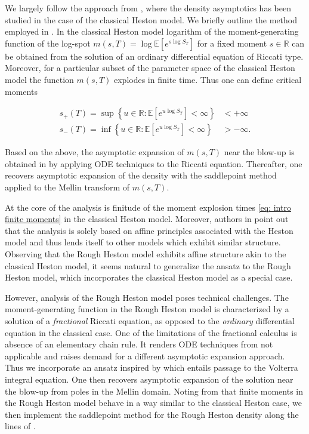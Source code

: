 \documentclass[12pt,twoside]{article}
\theoremstyle{plain}
\theoremstyle{plain}
\theoremstyle{definition}
\theoremstyle{remark}
\numberwithin{equation}{section}
\begin{document}
We largely follow the approach from \cite{FGGS10}, where the density asymptotics has been studied in the case of the classical Heston model. We briefly outline the method employed in \cite{FGGS10}. In the classical Heston model logarithm of the moment-generating function of the log-spot $m(s, T) = \log \mathbb E[e^{s \log S_T}]$ for a fixed moment $s \in \mathbb R$ can be obtained from the solution of an ordinary differential equation of Riccati type. Moreover, for a particular subset of the parameter space of the classical Heston model the function $m(s,T)$ explodes in finite time. Thus one can define critical moments

\begin{equation}
\label{eq: intro finite moments}
\begin{aligned}
s_+(T) =\sup \left\{u \in \mathbb{R}: \mathbb{E}\left[e^{u \log S_{T}}\right]<\infty\right\} & < +\infty \\
s_-(T) =\inf \left\{u \in \mathbb{R}: \mathbb{E}\left[e^{u \log S_{T}}\right]<\infty\right\} & > -\infty.
\end{aligned}
\end{equation}

Based on the above, the asymptotic expansion of $m(s, T)$ near the blow-up is obtained in \cite{FGGS10} by applying ODE techniques to the Riccati equation. Thereafter, one recovers asymptotic expansion of the density with the saddlepoint method applied to the Mellin transform of $m(s, T)$.

At the core of the analysis is finitude of the moment explosion times \eqref{eq: intro finite moments} in the classical Heston model. Moreover, authors in \cite{FGGS10} point out that the analysis is solely based on affine principles associated with the Heston model and thus lends itself to other models which exhibit similar structure. Observing that the Rough Heston model exhibits affine structure akin to the classical Heston model, it seems natural to generalize the ansatz to the Rough Heston model, which incorporates the classical Heston model as a special case.

However, analysis of the Rough Heston model poses technical challenges. The moment-generating function in the Rough Heston model is characterized by a solution of a \emph{fractional} Riccati equation, as opposed to the \emph{ordinary} differential equation in the classical case. One of the limitations of the fractional calculus is absence of an elementary chain rule. It renders ODE techniques from \cite{FGGS10} not applicable and raises demand for a different asymptotic expansion approach. Thus we incorporate an ansatz inspired by \cite{RO96} which entails passage to the Volterra integral equation. One then recovers asymptotic expansion of the solution near the blow-up from poles in the Mellin domain. Noting from \cite{GGP18} that finite moments in the Rough Heston model behave in a way similar to the classical Heston case, we then implement the saddlepoint method for the Rough Heston density along the lines of \cite{FGGS10}.
\end{document}
